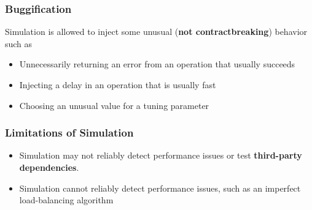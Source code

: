 \begin{frame}
    \frametitle{Buggification}
    Simulation is allowed to inject some unusual (\textbf{not contractbreaking}) behavior such as 
    \begin{itemize}
        \item Unnecessarily returning an error from an operation that usually succeeds
        \item Injecting a delay in an operation that is usually fast
        \item Choosing an unusual value for a tuning parameter
    \end{itemize}
\end{frame}
\begin{frame}
    \frametitle{Limitations of Simulation}
    \begin{itemize}
        \item Simulation may not reliably detect performance issues or test \textbf{third-party dependencies}.
        \item Simulation cannot reliably detect performance issues, such as an imperfect load-balancing algorithm
    \end{itemize}
\end{frame}
